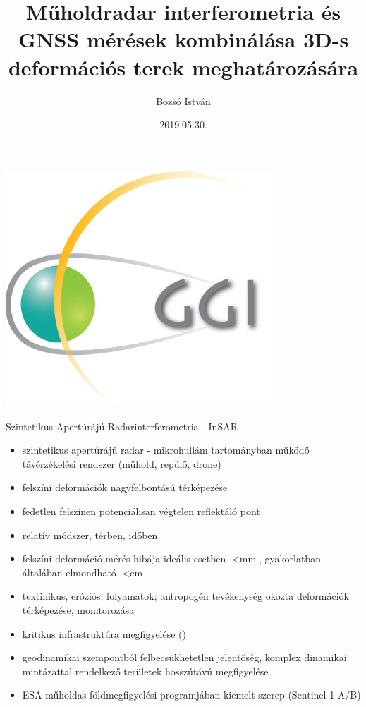 \documentclass{beamer}
\title[Komplex viszga, ELTE 2019]{Műholdradar interferometria és GNSS mérések
                                  kombinálása 3D-s deformációs terek meghatározására}
\author[Bozsó István]{Bozsó István}
\institute[MTA CSFK GGI]{MTA CSFK Geodéziai és Geofizikai Intézet}
\date{2019.05.30.}
\begin{document}
\begin{frame}
    \titlepage
    \begin{center}
        \begin{minipage}[c]{0.3\textwidth}
            \includegraphics[width=0.75\textwidth]{ggi_logo.png}
        \end{minipage}
    \end{center}
\end{frame}


\begin{frame}{Szintetikus Apertúrájú Radarinterferometria - InSAR}

\begin{itemize}
    \item szintetikus apertúrájú radar - mikrohullám tartományban működő
    távérzékelési rendszer (műhold, repülő, drone)
    \item felszíni deformációk nagyfelbontású térképezése
    \item fedetlen felszínen potenciálisan végtelen reflektáló pont
    \item relatív módszer, térben, időben
    \item felszíni deformáció mérés hibája ideális esetben $< \text{mm}$,
    gyakorlatban általában elmondható $< \text{cm}$
    \item tektinikus, eróziós, folyamatok; antropogén tevékenység okozta
    deformációk térképezése, monitorozása
    \item kritikus infrastruktúra megfigyelése ()
    \item geodinamikai szempontból felbecsükhetetlen jelentőség, komplex
    dinamikai mintázattal rendelkező területek hosszútávú megfigyelése
    \item ESA műholdas földmegfigyelési programjában kiemelt szerep
    (Sentinel-1 A/B)
\end{itemize}

\end{frame}
\end{document}
